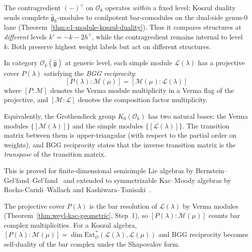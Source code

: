 \begin{remark}
\label{rem:contragredient-koszul}
The contragredient $(-)^\vee$ on $\mathcal{O}_k$ operates \emph{within} a fixed level; Koszul duality sends complete $\widehat{\mathfrak{g}}_k$-modules to conilpotent bar-comodules on the dual-side genus-$0$ lane \textup{(}Theorem~\ref{thm:e1-module-koszul-duality}\textup{)}. Thus it compares structures at \emph{different} levels $k' = -k - 2h^\vee$, while the contragredient remains internal to level~$k$. Both preserve highest weight labels but act on different structures.
\end{remark}

\begin{theorem}
\label{thm:bgg-reciprocity}
In category $\mathcal{O}_k(\widehat{\mathfrak{g}})$ at generic level,
each simple module $\mathcal{L}(\lambda)$ has a projective cover
$P(\lambda)$ satisfying the \emph{BGG reciprocity}:
\begin{equation}\label{eq:bgg-reciprocity}
[P(\lambda) : \mathcal{M}(\mu)]
= [\mathcal{M}(\mu) : \mathcal{L}(\lambda)]
\end{equation}
where $[P : \mathcal{M}]$ denotes the Verma module multiplicity in
a Verma flag of the projective, and
$[\mathcal{M} : \mathcal{L}]$ denotes the composition factor
multiplicity.

Equivalently, the Grothendieck group $K_0(\mathcal{O}_k)$ has two
natural bases: the Verma modules $\{[\mathcal{M}(\lambda)]\}$ and the
simple modules $\{[\mathcal{L}(\lambda)]\}$. The transition matrix
between them is upper-triangular (with respect to the partial order
on weights), and BGG reciprocity states that the inverse transition
matrix is the \emph{transpose} of the transition matrix.

This is proved for finite-dimensional semisimple Lie algebras by
Bernstein--Gel'fand--Gel'fand~\cite{BGG76} and extended to
symmetrizable Kac--Moody algebras by Rocha-Caridi--Wallach and
Kashiwara--Tanisaki~\cite{KT95}.
\end{theorem}

\begin{remark}
\label{rem:bgg-bar-cobar}
The projective cover $P(\lambda)$ is the bar resolution of $\mathcal{L}(\lambda)$ by Verma modules (Theorem~\ref{thm:weyl-kac-geometric}, Step~1), so $[P(\lambda) : \mathcal{M}(\mu)]$ counts bar complex multiplicities. For a Koszul algebra, $[P(\lambda) : \mathcal{M}(\mu)] = \dim \mathrm{Ext}^*_{\mathcal{O}}(\mathcal{L}(\lambda), \mathcal{L}(\mu))$ and BGG reciprocity becomes self-duality of the bar complex under the Shapovalov form.
\end{remark}

